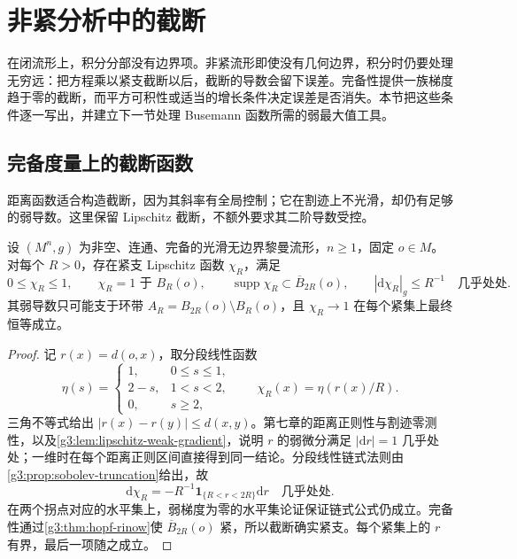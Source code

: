 
% 
% 

\section{非紧分析中的截断}
\label{g3:sec:1504}

在闭流形上，积分分部没有边界项。非紧流形即使没有几何边界，积分时仍要处理无穷远：把方程乘以紧支截断以后，截断的导数会留下误差。完备性提供一族梯度趋于零的截断，而平方可积性或适当的增长条件决定误差是否消失。本节把这些条件逐一写出，并建立下一节处理 Busemann 函数所需的弱最大值工具。

\subsection{完备度量上的截断函数}
\label{g3:subsec:1504:01}
距离函数适合构造截断，因为其斜率有全局控制；它在割迹上不光滑，却仍有足够的弱导数。这里保留 Lipschitz 截断，不额外要求其二阶导数受控。

\begin{proposition}\label{g3:prop:complete-lipschitz-cutoffs}
	设 \((M^n,g)\) 为非空、连通、完备的光滑无边界黎曼流形，\(n\ge1\)，固定 \(o\in M\)。对每个 \(R>0\)，存在紧支 Lipschitz 函数 \(\chi_R\)，满足
	\[
		0\le\chi_R\le1,\qquad
		\chi_R=1\text{ 于 }B_R(o),\qquad
		\operatorname{supp}\chi_R\subset\overline B_{2R}(o),
		\qquad |\mathrm d\chi_R|_g\le R^{-1}\quad\text{几乎处处}.
	\]
	其弱导数只可能支于环带 \(A_R=B_{2R}(o)\setminus B_R(o)\)，且 \(\chi_R\to1\) 在每个紧集上最终恒等成立。
\end{proposition}
\begin{proof}
	记 \(r(x)=d(o,x)\)，取分段线性函数
	\[
		\eta(s)=
		\begin{cases}
		1,&0\le s\le1,\\
		2-s,&1<s<2,\\
		0,&s\ge2,
		\end{cases}
		\qquad \chi_R(x)=\eta(r(x)/R).
	\]
	三角不等式给出 \(|r(x)-r(y)|\le d(x,y)\)。第七章的距离正则性与割迹零测性，以及\cref{g3:lem:lipschitz-weak-gradient}，说明 \(r\) 的弱微分满足 \(|\mathrm dr|=1\) 几乎处处；一维时在每个距离正则区间直接得到同一结论。分段线性链式法则由\cref{g3:prop:sobolev-truncation}给出，故
	\[
		\mathrm d\chi_R=-R^{-1}\mathbf1_{\{R<r<2R\}}\mathrm dr
		\quad\text{几乎处处}.
	\]
	在两个拐点对应的水平集上，弱梯度为零的水平集论证保证链式公式仍成立。完备性通过\cref{g3:thm:hopf-rinow}使 \(\overline B_{2R}(o)\) 紧，所以截断确实紧支。每个紧集上的 \(r\) 有界，最后一项随之成立。
\end{proof}

